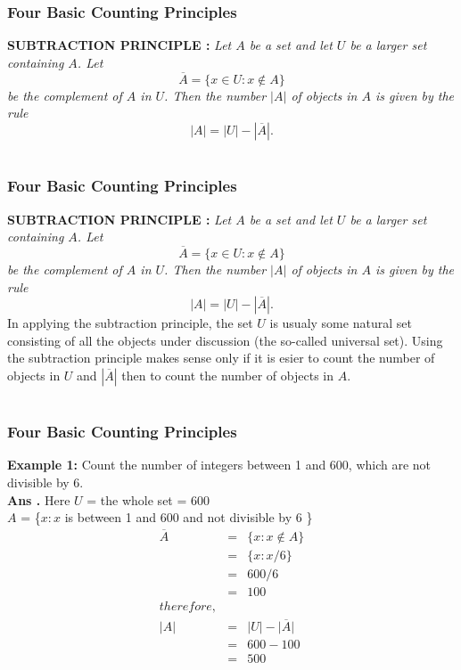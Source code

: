 \documentclass{beamer}
\begin{document}
 \section{}
 \begin{frame}
\frametitle{Four Basic Counting Principles}
{\Large \bf SUBTRACTION PRINCIPLE : }
{\it Let $A$ be a set and let  $U$ be a larger set containing $ A$. Let 
                     $$\overline{A}= \{ x\in U: x \not\in A\} $$
be the complement of $ A$ in $U$. Then the number $|A|$ of objects in $A$ is given by the rule 
       $$|A|=|U|-|\overline{A}|.$$}
\end{frame}




 \section{}
 \begin{frame}
\frametitle{Four Basic Counting Principles}
{\Large \bf SUBTRACTION PRINCIPLE : }
{\it Let $A$ be a set and let  $U$ be a larger set containing $ A$. Let 
                     $$\overline{A}= \{ x\in U: x \not\in A\} $$
be the complement of $ A$ in $U$. Then the number $|A|$ of objects in $A$ is given by the rule 
       $$|A|=|U|-|\overline{A}|.$$}
In applying the subtraction principle, the set $U$ is usualy some natural set consisting of all the objects under discussion (the so-called universal set). Using the subtraction principle makes sense only if it is esier to count the number of objects in $U$ and $|\overline{A}|$ then to count the number of objects in $A$.
\end{frame}


 \section{}
 \begin{frame}
\frametitle{Four Basic Counting Principles}
{\bf Example 1: }Count the number of integers between 1 and 600, which are not divisible by 6.\\
{\bf Ans . } Here $U$ = the whole set = 600 \\
        $A$ = \{$x:x$ is between 1 and 600 and not divisible  by 6 \}
   \begin{eqnarray*}
           \overline{A} &=& \{x : x \not\in A \} \\
                       &=& \{ x : x/6 \}\\
                      &=&600/6\\
                           &=& 100\\
                        therefore,\\
                            |A| &=& |U|-\overline{|A|} \\
                             &=&600-100\\
                               &=&500\\
                 \end{eqnarray*}

\end{frame}
\end{document}
